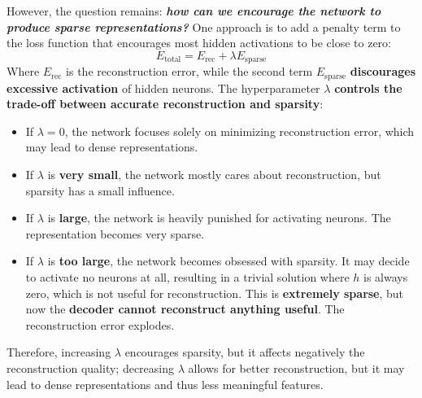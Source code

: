 \highspace
However, the question remains: \emph{\textbf{how can we encourage the network to produce sparse representations?}} One approach is to add a penalty term to the loss function that encourages most hidden activations to be close to zero:
\begin{equation}\label{eq:sparse-autoencoder-loss}
    E_{\text{total}} = E_{\text{rec}} + \lambda E_{\text{sparse}}
\end{equation}
Where $E_{\text{rec}}$ is the reconstruction error, while the second term $E_{\text{sparse}}$ \textbf{discourages excessive activation} of hidden neurons. The hyperparameter $\lambda$ \textbf{controls the trade-off between accurate reconstruction and sparsity}:
\begin{itemize}
    \item If $\lambda=0$, the network focuses solely on minimizing reconstruction error, which may lead to dense representations.
    \item If $\lambda$ is \textbf{very small}, the network mostly cares about reconstruction, but sparsity has a small influence.
    \item If $\lambda$ is \textbf{large}, the network is heavily punished for activating neurons. The representation becomes very sparse.
    \item If $\lambda$ is \textbf{too large}, the network becomes obsessed with sparsity. It may decide to activate no neurons at all, resulting in a trivial solution where $h$ is always zero, which is not useful for reconstruction. This is \textbf{extremely sparse}, but now the \textbf{decoder cannot reconstruct anything useful}. The reconstruction error explodes.
\end{itemize}
Therefore, increasing $\lambda$ encourages sparsity, but it affects negatively the reconstruction quality; decreasing $\lambda$ allows for better reconstruction, but it may lead to dense representations and thus less meaningful features.

